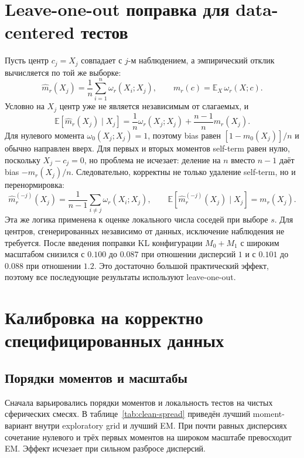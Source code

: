 \documentclass[11pt,a4paper]{article}
\newcommand{\E}{\mathbb{E}}
\newcommand{\Mzero}{M_0}
\newcommand{\Mone}{M_1}
\begin{document}
\section{Leave-one-out поправка для data-centered тестов}
\label{sec:loo}

Пусть центр $c_j=X_j$ совпадает с $j$-м наблюдением, а эмпирический отклик
вычисляется по той же выборке:
\begin{equation}
  \widehat m_r(X_j)=\frac1n\sum_{i=1}^{n}\omega_r(X_i;X_j),
  \qquad
  m_r(c)=\E_X\,\omega_r(X;c).
\end{equation}
Условно на $X_j$ центр уже не является независимым от слагаемых, и
\begin{equation}
  \E\!\left[\widehat m_r(X_j)\mid X_j\right]
  =\frac1n\omega_r(X_j;X_j)+\frac{n-1}{n}m_r(X_j).
  \label{eq:self-bias}
\end{equation}
Для нулевого момента $\omega_0(X_j;X_j)=1$, поэтому bias равен
$[1-m_0(X_j)]/n$ и обычно направлен вверх. Для первых и вторых моментов
self-term равен нулю, поскольку $X_j-c_j=0$, но проблема не исчезает:
деление на $n$ вместо $n-1$ даёт bias $-m_r(X_j)/n$. Следовательно, корректны
не только удаление self-term, но и перенормировка:
\begin{equation}
  \widehat m_r^{(-j)}(X_j)
  =\frac1{n-1}\sum_{i\ne j}\omega_r(X_i;X_j),
  \qquad
  \E\!\left[\widehat m_r^{(-j)}(X_j)\mid X_j\right]=m_r(X_j).
  \label{eq:loo}
\end{equation}
Эта же логика применена к оценке локального числа соседей при выборе $s$.
Для центров, сгенерированных независимо от данных, исключение наблюдения не
требуется. После введения поправки KL конфигурации $\Mzero+\Mone$ с широким
масштабом снизился с $0.100$ до $0.087$ при отношении дисперсий $1$ и с
$0.101$ до $0.088$ при отношении $1.2$. Это достаточно большой практический
эффект, поэтому все последующие результаты используют leave-one-out.

\section{Калибровка на корректно специфицированных данных}

\subsection{Порядки моментов и масштабы}

Сначала варьировались порядки моментов и локальность тестов на чистых
сферических смесях. В таблице~\ref{tab:clean-spread} приведён лучший
moment-вариант внутри exploratory grid и лучший EM. При почти равных
дисперсиях сочетание нулевого и трёх первых моментов на широком масштабе
превосходит EM. Эффект исчезает при сильном разбросе дисперсий.
\end{document}
